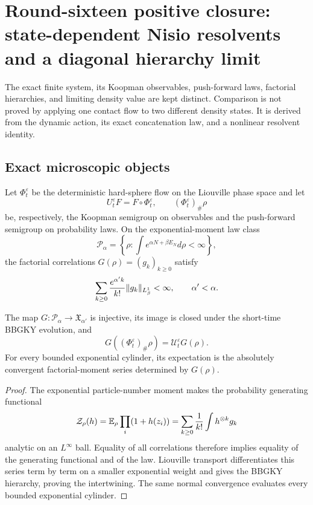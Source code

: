 \section{Round-sixteen positive closure: state-dependent Nisio resolvents and a diagonal hierarchy limit}
\label{sec:r16-b4}

The exact finite system, its Koopman observables, push-forward laws, factorial
hierarchies, and limiting density value are kept distinct.  Comparison is not
proved by applying one contact flow to two different density states.  It is
derived from the dynamic action, its exact concatenation law, and a nonlinear
resolvent identity.

\subsection{Exact microscopic objects}

Let \(\Phi_t^\varepsilon\) be the deterministic hard-sphere flow on the
Liouville phase space and let
\[
 U_t^\varepsilon F=F\circ\Phi_t^\varepsilon,
 \qquad
 (\Phi_t^\varepsilon)_\#\rho
\]
be, respectively, the Koopman semigroup on observables and the push-forward
semigroup on probability laws.  On the exponential-moment law class
\[
 \mathcal P_\alpha=
 \left\{\rho:\int e^{\alpha N+\beta E_N}d\rho<\infty\right\},
\]
the factorial correlations \(G(\rho)=(g_k)_{k\ge0}\) satisfy
\[
 \sum_{k\ge0}{e^{\alpha'k}\over k!}
 \|g_k\|_{L^1_\beta}<\infty,
 \qquad \alpha'<\alpha.
\]

\begin{theorem}
\label{thm:r16-b4-intertwiner}
The map \(G:\mathcal P_\alpha\to\mathfrak X_{\alpha'}\) is injective, its
image is closed under the short-time BBGKY evolution, and
\[
 G((\Phi_t^\varepsilon)_\#\rho)
 =\mathscr U_t^\varepsilon G(\rho).
\]
For every bounded exponential cylinder, its expectation is the absolutely
convergent factorial-moment series determined by \(G(\rho)\).
\end{theorem}

\begin{proof}
The exponential particle-number moment makes the probability generating
functional
\[
 \mathcal Z_\rho(h)=
 \mathbb E_\rho\prod_i(1+h(z_i))
 =\sum_{k\ge0}{1\over k!}\int h^{\otimes k}g_k
\]
analytic on an \(L^\infty\) ball.  Equality of all correlations therefore
implies equality of the generating functional and of the law.  Liouville
transport differentiates this series term by term on a smaller exponential
weight and gives the BBGKY hierarchy, proving the intertwining.  The same
normal convergence evaluates every bounded exponential cylinder.
\end{proof}

